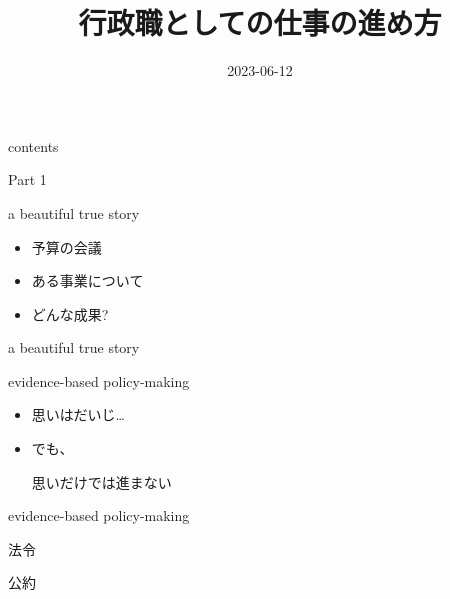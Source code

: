 \documentclass[
  ignorenonframetext,
  aspectratio=169]{beamer}
\title{行政職としての仕事の進め方\\}
\author{}
\date{\vspace{-2.5em}2023-06-12}
\begin{document}
\frame{\titlepage}

\begin{frame}{contents}
\protect\hypertarget{contents}{}
\Huge

\end{frame}

\begin{frame}{Part 1}
\protect\hypertarget{part-1}{}
\Huge

\scalebox{2}{\textcolor{lightpurple}{データ}}
\end{frame}

\begin{frame}{a beautiful true story}
\protect\hypertarget{a-beautiful-true-story}{}
\Huge

\begin{itemize}
\item[\textbullet] 予算の会議
\item[\textbullet] ある事業について
\item[\textbullet] どんな成果?
\end{itemize}
\end{frame}

\begin{frame}{a beautiful true story}
\protect\hypertarget{a-beautiful-true-story-1}{}
\end{frame}

\begin{frame}{evidence-based policy-making}
\protect\hypertarget{evidence-based-policy-making}{}
\Huge

\begin{itemize}
\item 思いはだいじ\ldots\pause
\item でも、\par
思いだけでは進まない
\end{itemize}
\pause
\vspace*{-22pt}
\hspace*{18pt}
\end{frame}

\begin{frame}{evidence-based policy-making}
\protect\hypertarget{evidence-based-policy-making-1}{}
\Huge

法令\pause

公約\pause

\scalebox{1.732}{\textcolor{red!40}{データ}}
\end{frame}
\end{document}
